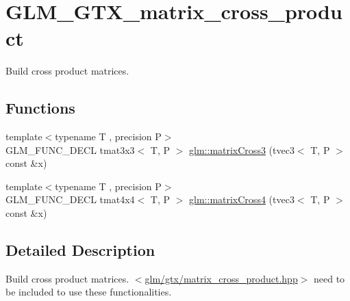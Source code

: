 \hypertarget{group__gtx__matrix__cross__product}{\section{G\-L\-M\-\_\-\-G\-T\-X\-\_\-matrix\-\_\-cross\-\_\-product}
\label{group__gtx__matrix__cross__product}
}


Build cross product matrices.  


\subsection*{Functions}
\begin{DoxyCompactItemize}
\item 
{\footnotesize template$<$typename T , precision P$>$ }\\G\-L\-M\-\_\-\-F\-U\-N\-C\-\_\-\-D\-E\-C\-L tmat3x3$<$ T, P $>$ \hyperlink{group__gtx__matrix__cross__product_ga04385b2e3a93c78d116b51af2d8d708e}{glm\-::matrix\-Cross3} (tvec3$<$ T, P $>$ const \&x)
\item 
{\footnotesize template$<$typename T , precision P$>$ }\\G\-L\-M\-\_\-\-F\-U\-N\-C\-\_\-\-D\-E\-C\-L tmat4x4$<$ T, P $>$ \hyperlink{group__gtx__matrix__cross__product_ga2d46cc5253761c214aa5c782865156b1}{glm\-::matrix\-Cross4} (tvec3$<$ T, P $>$ const \&x)
\end{DoxyCompactItemize}


\subsection{Detailed Description}
Build cross product matrices. $<$\hyperlink{matrix__cross__product_8hpp}{glm/gtx/matrix\-\_\-cross\-\_\-product.\-hpp}$>$ need to be included to use these functionalities. 

